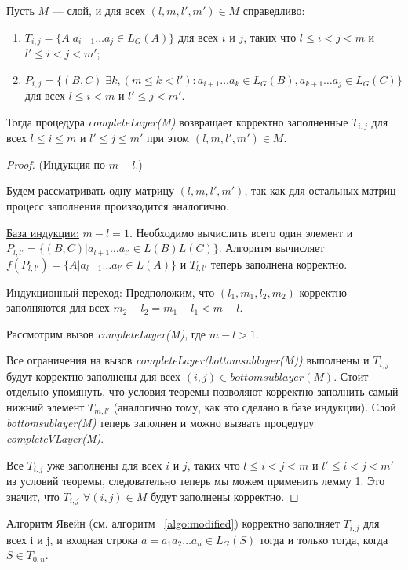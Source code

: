 \begin{thrm}
Пусть $M$ --- слой, и для всех $(l, m, l', m') \in M$ справедливо:
\begin{enumerate}
  \item $T_{i, j} = \{ A |  a_{i + 1} \dots a_{j} \in L_G(A)\}$ для всех $i$ и $j$, таких что $l \leq i < j < m$ и $l' \leq i < j < m'$;
  \item $P_{i, j} =  \{ (B, C) |\exists k, (m \le k < l'): a_{i + 1} \dots a_{k} \in L_G(B), a_{k + 1} \dots a_{j} \in L_G(C)\}$ для всех $l \leq i < m$ и $l' \leq j < m'$.
\end{enumerate}

Тогда процедура \textit{completeLayer(M)} возвращает корректно заполненные $T_{i, j}$ для всех $l \leq i \le m$ и $l' \leq j \le m'$ при этом $(l, m, l', m') \in M$.
\end{thrm}


\begin{proof}(Индукция по $m - l$.)

Будем рассматривать одну матрицу $(l, m, l', m')$, так как для остальных матриц процесс заполнения производится аналогично.

\underline{База индукции:} $m - l = 1$. Необходимо вычислить всего один элемент и $P_{l, l'} =  \{ (B, C) |  a_{l + 1} \dots a_{l'} \in L(B)L(C)\}$. Алгоритм вычисляет $f(P_{l, l'}) = \{ A |  a_{l + 1} \dots a_{l'} \in L(A)\}$ и $T_{l, l'}$ теперь заполнена корректно.

\underline{Индукционный переход:} Предположим, что $(l_1, m_1, l_2, m_2)$ корректно заполняются для всех $m_2 - l_2 = m_1 - l_1 < m - l$.

Рассмотрим вызов \textit{completeLayer(M)}, где $m - l > 1$.

Все ограничения на вызов \textit{completeLayer(bottomsublayer(M))} выполнены и $T_{i, j}$ будут корректно заполнены для всех $(i, j) \in bottomsublayer(M)$. Стоит отдельно упомянуть, что условия теоремы позволяют корректно заполнить самый нижний элемент $T_{m, l'}$ (аналогично тому, как это сделано в базе индукции).
Слой \textit{bottomsublayer(M)} теперь заполнен и можно вызвать процедуру \textit{completeVLayer(M)}.

Все $T_{i,j}$ уже заполнены для всех $i$ и $j$, таких что $l \leq i < j < m$ и $l' \leq i < j < m'$ из условий теоремы, следовательно теперь мы можем применить лемму 1. Это значит, что $T_{i, j}$ $\forall (i, j) \in M$ будут заполнены корректно.
\end{proof}

\begin{thrm}
Алгоритм Явейн (см. алгоритм ~\ref{algo:modified}) корректно заполняет $T_{i, j}$ для всех i и j, и входная строка $a = a_{1}a_{2} \dots a_{n} \in L_{G}(S)$ тогда и только тогда, когда $S \in T_{0, n}$.
\end{thrm}


